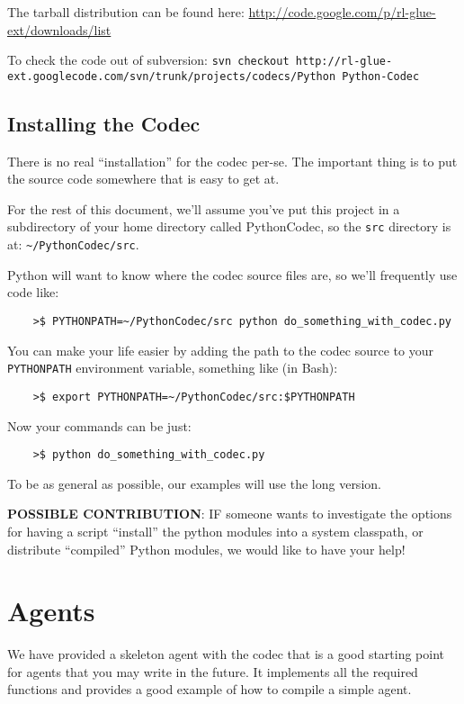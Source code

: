 \documentclass[11pt]{article}
\begin{document}
The tarball distribution can be found here:\newline
\url{http://code.google.com/p/rl-glue-ext/downloads/list}


To check the code out of subversion:\newline
\small \texttt{svn checkout http://rl-glue-ext.googlecode.com/svn/trunk/projects/codecs/Python Python-Codec} \normalsize

\subsection{Installing the Codec}
There is no real ``installation'' for the codec per-se.  The important thing is to put the source code somewhere that is easy to get at.

For the rest of this document, we'll assume you've put this project in a subdirectory of your home directory called PythonCodec, 
so the \texttt{src} directory is at: \texttt{\~{}/PythonCodec/src}.

Python will want to know where the codec source files are, so we'll frequently use code like:
\begin{verbatim}
	>$ PYTHONPATH=~/PythonCodec/src python do_something_with_codec.py
\end{verbatim}

You can make your life easier by adding the path to the codec source to your \texttt{PYTHONPATH} environment variable, something like (in Bash):
\begin{verbatim}
	>$ export PYTHONPATH=~/PythonCodec/src:$PYTHONPATH
\end{verbatim}

Now your commands can be just:
\begin{verbatim}
	>$ python do_something_with_codec.py
\end{verbatim}

To be as general as possible, our examples will use the long version.


\textbf{POSSIBLE CONTRIBUTION}: IF someone wants to investigate the options for having a script ``install'' the python modules into a system classpath, or distribute 
``compiled'' Python modules, we would like to have your help!


\section{Agents}
\label{sec:agent}
We have provided a skeleton agent with the codec that is a good starting point for agents that you may write in the future.
It implements all the required functions and provides a good example of how to compile a simple agent.
\end{document}
